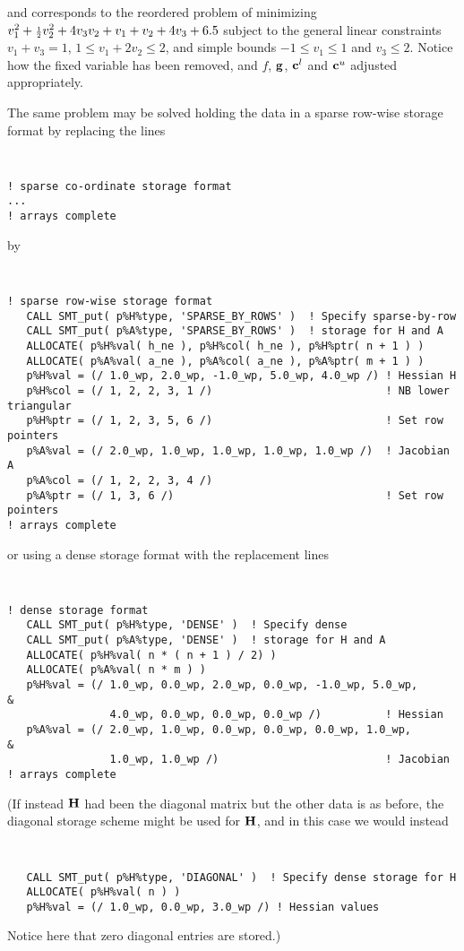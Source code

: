 \documentclass{galahad}
\begin{document}
\noindent
and corresponds to the reordered problem of minimizing
$v_1^2 + {\scriptstyle \frac{1}{2}} v_2^2 + 4 v_3 v_2 + v_1 + v_2 + 4 v_3 + 6.5$
subject to the general linear constraints
$v_1 + v_3 = 1$, $1 \leq v_1 + 2 v_2 \leq 2$,
and simple bounds
$-1 \leq v_1 \leq 1$ and $v_3 \leq 2$. Notice how the
fixed variable has been removed, and $f$, ${\mathbf{g}}$, ${\mathbf{c}}^l$ and ${\mathbf{c}}^u$
adjusted appropriately.

The same problem may be solved holding the data in
a sparse row-wise storage format by replacing the lines
{\tt \small
\begin{verbatim}
! sparse co-ordinate storage format
...
! arrays complete
\end{verbatim}
}
\noindent
by
{\tt \small
\begin{verbatim}
! sparse row-wise storage format
   CALL SMT_put( p%H%type, 'SPARSE_BY_ROWS' )  ! Specify sparse-by-row
   CALL SMT_put( p%A%type, 'SPARSE_BY_ROWS' )  ! storage for H and A
   ALLOCATE( p%H%val( h_ne ), p%H%col( h_ne ), p%H%ptr( n + 1 ) )
   ALLOCATE( p%A%val( a_ne ), p%A%col( a_ne ), p%A%ptr( m + 1 ) )
   p%H%val = (/ 1.0_wp, 2.0_wp, -1.0_wp, 5.0_wp, 4.0_wp /) ! Hessian H
   p%H%col = (/ 1, 2, 2, 3, 1 /)                           ! NB lower triangular
   p%H%ptr = (/ 1, 2, 3, 5, 6 /)                           ! Set row pointers
   p%A%val = (/ 2.0_wp, 1.0_wp, 1.0_wp, 1.0_wp, 1.0_wp /)  ! Jacobian A
   p%A%col = (/ 1, 2, 2, 3, 4 /)
   p%A%ptr = (/ 1, 3, 6 /)                                 ! Set row pointers
! arrays complete
\end{verbatim}
}
\noindent
or using a dense storage format with the replacement lines
{\tt \small
\begin{verbatim}
! dense storage format
   CALL SMT_put( p%H%type, 'DENSE' )  ! Specify dense
   CALL SMT_put( p%A%type, 'DENSE' )  ! storage for H and A
   ALLOCATE( p%H%val( n * ( n + 1 ) / 2) )
   ALLOCATE( p%A%val( n * m ) )
   p%H%val = (/ 1.0_wp, 0.0_wp, 2.0_wp, 0.0_wp, -1.0_wp, 5.0_wp,              &
                4.0_wp, 0.0_wp, 0.0_wp, 0.0_wp /)          ! Hessian
   p%A%val = (/ 2.0_wp, 1.0_wp, 0.0_wp, 0.0_wp, 0.0_wp, 1.0_wp,               &
                1.0_wp, 1.0_wp /)                          ! Jacobian
! arrays complete
\end{verbatim}
}
\noindent
(If instead ${\mathbf{H}}$ had been the diagonal matrix
but the other data is as before, the diagonal storage scheme
might be used for ${\mathbf{H}}$, and in this case we would instead
{\tt \small
\begin{verbatim}
   CALL SMT_put( p%H%type, 'DIAGONAL' )  ! Specify dense storage for H
   ALLOCATE( p%H%val( n ) )
   p%H%val = (/ 1.0_wp, 0.0_wp, 3.0_wp /) ! Hessian values
\end{verbatim}
}
\noindent
Notice here that zero diagonal entries are stored.)
\end{document}
